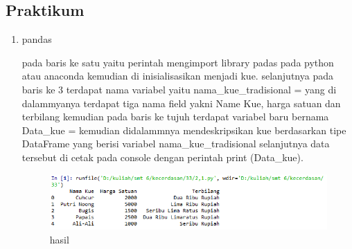\subsection{Praktikum}
\begin{enumerate}
\item pandas \par
pada baris ke satu yaitu perintah mengimport library padas pada python atau anaconda kemudian di inisialisasikan menjadi kue. selanjutnya pada baris ke 3 terdapat nama variabel yaitu nama\_kue\_tradisional = yang di dalammyanya terdapat tiga nama field yakni Name Kue, harga satuan dan terbilang kemudian pada baris ke tujuh terdapat variabel baru bernama Data\_kue = kemudian didalammnya mendeskripsikan kue berdasarkan tipe DataFrame yang berisi variabel nama\_kue\_tradisional selanjutnya data tersebut di cetak pada console dengan perintah print (Data\_kue).

\begin{figure}[ht]
\centering
\includegraphics[scale=0.5]{figures/1174051/3/4.PNG}
\caption{hasil}
\label{contoh}
\end{figure}


\end{enumerate}
